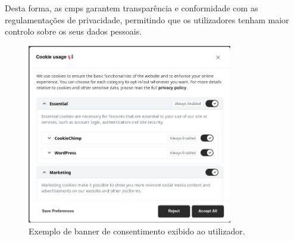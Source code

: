 Desta forma, as \acrshort{cmp}s garantem transparência e conformidade com as regulamentações de privacidade, permitindo que os utilizadores tenham maior controlo sobre os seus dados pessoais.

\begin{figure}[h]
\begin{center}
	\includegraphics[width=0.8\textwidth]{images/banner.png}
\end{center}
\caption{Exemplo de banner de consentimento exibido ao utilizador.}
\label{fig:banner}
\end{figure}

\newpage





